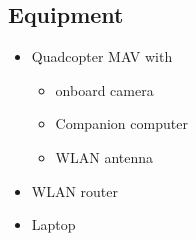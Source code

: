 \subsection{Equipment} \label{sub:the_UAV_of_this_research}

\begin{itemize}
    \item Quadcopter MAV with 
    \begin{itemize}
        \item onboard camera
        \item Companion computer
        \item WLAN antenna
    \end{itemize}
    \item WLAN router
    \item Laptop
\end{itemize}





%
%
%
%
%
%
% 
%
%
%








